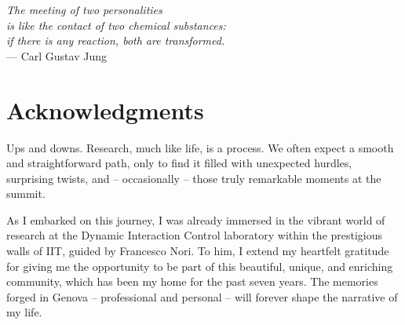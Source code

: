 
\cleardoublepage

{}

\vspace*{-1.4cm}
\begin{addmargin}{-1.0cm}

\begin{flushright}
    \textsl{\onehalfspacing
    The meeting of two personalities \\
    is like the contact of two chemical substances:\\
    if there is any reaction, both are transformed.}\\
    --- Carl Gustav Jung
\end{flushright}

\bigskip

\begingroup
{}

\let\cleardoublepage\relax

\vspace*{-0.7cm}
\chapter*{Acknowledgments}
\vspace*{-0.6cm}

Ups and downs. Research, much like life, is a process.
We often expect a smooth and straightforward path, only to find it filled with unexpected hurdles, surprising twists, and -- occasionally -- those truly remarkable moments at the summit.

As I embarked on this journey, I was already immersed in the vibrant world of research at the Dynamic Interaction Control laboratory within the prestigious walls of {\small IIT}, guided by Francesco Nori.
To him, I extend my heartfelt gratitude for giving me the opportunity to be part of this beautiful, unique, and enriching community, which has been my home for the past seven years.
The memories forged in Genova -- professional and personal -- will forever shape the narrative of my life.


\end{addmargin}
